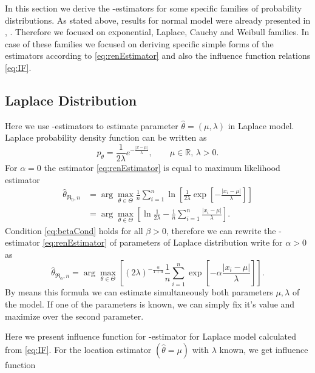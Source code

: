
In this section we derive the \mRa-estimators for some specific families of probability distributions. As stated above, results for normal model were already presented in  \cite{Vajda2009}, \cite{Demut2010}. Therefore we focused on exponential, Laplace, Cauchy and Weibull families. In case of these families we focused on deriving specific simple forms of the estimators according to \eqref{eq:renEstimator} and also the influence function relations \eqref{eq:IF}.

\subsection{Laplace Distribution} 
Here we use \mRa-estimators to estimate parameter $\hat{\theta} = (\mu,\lambda)$ in Laplace model. Laplace probability density function can be written as 
\begin{equation}
	p_\theta = \frac{1}{2\lambda} e^{-\frac{|x-\mu|}{\lambda}}, \qquad \mu\in \mathbb{R},\, \lambda>0.
\end{equation}
For $\alpha = 0$ the estimator \eqref{eq:renEstimator} is equal to maximum likelihood estimator
\begin{align}
	\hat{\theta}_{\mathfrak{R}_0,n} & = \arg \max_{\theta \in \Theta} \frac{1}{n} \sum^n_{i=1} \ln \left[ \frac{1}{2\lambda}\exp \left[-\frac{|x_i-\mu|}{\lambda} \right] \right] \nonumber \\
	& =  \arg \max_{\theta \in \Theta} \left[ \ln \frac{1}{2\lambda} - \frac{1}{n} \sum^n_{i=1} \frac{|x_i-\mu|}{\lambda} \right].
\end{align}
Condition \eqref{eq:betaCond} holds for all $\beta>0$, therefore we can rewrite the \mRa-estimator \eqref{eq:renEstimator} of parameters of Laplace distribution write for $\alpha>0$ as
\begin{equation}
	\hat{\theta}_{\mathfrak{R}_\alpha,n} = \arg \max_{\theta \in \Theta} \left[ (2\lambda)^{-\frac{\alpha}{1+\alpha}} \frac{1}{n} \sum_{i=1}^n \exp \left[-\alpha\frac{|x_i-\mu|}{\lambda} \right] \right].
	\label{renyi-formula-laplace}
\end{equation}
By means this formula we can estimate simultaneously both parameters $\mu, \lambda$ of the model. If one of the parameters is known, we can simply fix it's value and maximize over the second parameter.

Here we present influence function for \mRa-estimator for Laplace model calculated from \eqref{eq:IF}. For the location estimator $(\hat{\theta} = \mu)$ with $\lambda$ known, we get influence function

